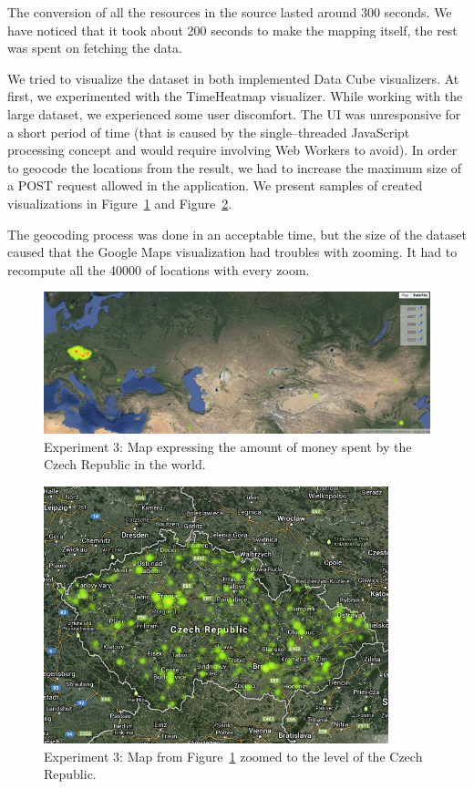 The conversion of all the resources in the source lasted around 300 seconds. We 
have noticed that it took about 200 seconds to make the mapping itself, the rest 
was spent on fetching the data.

We tried to visualize the dataset in both implemented Data Cube visualizers. At first, we experimented 
with the TimeHeatmap visualizer. While working with the large dataset, we 
experienced some user discomfort. The UI was unresponsive for a short period of time
(that is caused by the single--threaded JavaScript processing concept and would require
involving Web Workers to avoid). 
In order to geocode the locations from the result, we had to increase the 
maximum size of a POST request allowed in the application. We present samples of 
created visualizations in Figure~\ref{fig:contracts-map-world} and 
Figure~\ref{fig:contracts-map-zoomed}.

The geocoding process was done in an acceptable time, but the size of the 
dataset caused that the Google Maps visualization had troubles with zooming. It 
had to recompute all the 40000 of locations with every zoom.

\begin{figure}
  \centering
  \includegraphics[width=140mm]{img/contracts-map-world.png}
  \caption{Experiment 3: Map expressing the amount of money spent by the Czech Republic in the world.}
  \label{fig:contracts-map-world}
\end{figure}

\begin{figure}
  \centering
  \includegraphics[width=100mm]{img/contracts-map-zoomed.png}
  \caption{Experiment 3: Map from Figure~\ref{fig:contracts-map-world} zoomed to the level of the Czech Republic.}
  \label{fig:contracts-map-zoomed}
\end{figure}

